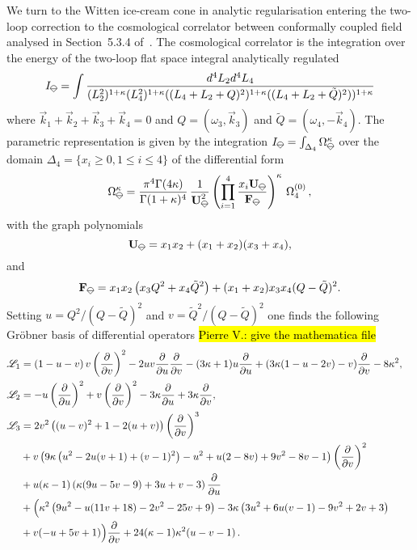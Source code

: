 \documentclass[a4paper,12pt]{article}
\numberwithin{equation}{section}
\numberwithin{figure}{section}
\newcommand{\pvnote}[1]{\sethlcolor{bubblegum} \protect\hl{Pierre V.: #1} \sethlcolor{yellow}}
\newcommand{\IceCream}{	\begin{tikzpicture}[scale=0.05]
	\draw[color = black, fill=none] (2,0) arc(0:180:2);
		\draw [black] (-2,0) to (2,0);
		\draw [black] (-2,0) to (0,-2);
                	\draw [black] (2,0) to (0,-2);
	\end{tikzpicture}}
\begin{document}
We turn to the Witten ice-cream cone in analytic regularisation
entering the two-loop correction to the cosmological correlator
between conformally coupled field analysed in Section~5.3.4 of~\cite{Chowdhury:2023arc}.
The cosmological correlator is the integration over the energy of the
two-loop flat space integral analytically regulated
\begin{equation}
  I_{\IceCream}= \int \frac{d^{4}L_{2}d^{4}L_{4}}{(L_2^2)^{1+\kappa}(L_4^2)^{1+\kappa}((L_4+L_2+Q)^2)^{1+\kappa}((L_4+L_2+\tilde Q)^2))^{1+\kappa} }  
\end{equation}
where $\vec k_1+\vec k_2+\vec k_3+\vec k_4=0$ and $Q=(\omega_3,\vec
k_3)$ and $\tilde Q=(\omega_4,-\vec k_4)$.
The parametric representation is given by the integration 
$
  I_{\IceCream} = \int_{\Delta_4} \Omega_{\IceCream}^\kappa
$
over the domain $\Delta_4=\{x_i\geq0,1\leq i\leq 4\}$ of the
differential form
\begin{equation}
  \Omega_{\IceCream}^\kappa= {\pi^4\Gamma(4\kappa)\over
    \Gamma(1+\kappa)^4} \,{1\over \textbf{U}_{\IceCream}^{2} }
  \left(\prod_{i=1}^4 {x_i\textbf{U}_{\IceCream}\over \textbf{F}_{\IceCream}}  \right)^\kappa\,\Omega_4^{(0)}\,,
\end{equation}
with the graph polynomials
\begin{equation}
    \textbf{U}_{\IceCream}=x_1x_2+(x_1+x_2)(x_3+x_4),
  \end{equation}
  and
  \begin{equation}
    \textbf{F}_{\IceCream}=x_1x_2\left(x_3 Q^2+x_4 \tilde
      Q^2\right)+(x_1+x_2)x_3x_4 (Q-\tilde Q)^2.
  \end{equation}
  Setting  $u= Q^2/(Q-\tilde Q)^2$ and $v=\tilde Q^2/(Q-\tilde Q)^2$
  one finds the following Gr\"obner basis of differential operators
  \pvnote{give the mathematica file}
  \begin{align}
  \mathscr{L}_1&=\left(1-u
   -v\right) v\left(\partial\over\partial v\right)^{2} -2u
                 v{\partial\over\partial u}{\partial\over\partial
                 v}-(3 \kappa+1)u {\partial\over\partial u}+(3 \kappa
                 (1-  u-2  v)-v){\partial\over\partial v}-8 \kappa ^2,\cr
  \mathscr{L}_2&=     -u\left(\partial\over\partial u\right)^{2}    +v\left(\partial\over\partial v\right)^{2}       -3 \kappa
   {\partial\over\partial u}+3 \kappa
                 {\partial\over\partial v},\cr
 \mathscr{L}_3&=       2v^2 \left((u-v)^2+1-2(u+v)\right) \left(\partial\over
                \partial v\right)^3\cr
                &+v\left(9 \kappa  \left(u^2-2 u
                (v+1)+(v-1)^2\right)-u^2+u (2-8 v)+9 v^2-8
                v-1\right)\left(\partial\over\partial
                  v\right)^2\cr
                  &+u(\kappa-1)\left(\kappa  (9 u-5 v-9)+3
                    u+v-3\right){\partial\over\partial u}\cr
                    &+\Big(\kappa ^2 \left(9 u^2-u (11 v+18)-2 v^2-25 v+9\right)-3 \kappa  \left(3 u^2+6 u (v-1)-9
                      v^2+2 v+3\right)\cr
                      &+v (-u+5 v+1)\Big){\partial\over\partial v}+24 (\kappa -1) \kappa ^2 (u-v-1)\,.
  \end{align}
\end{document}
